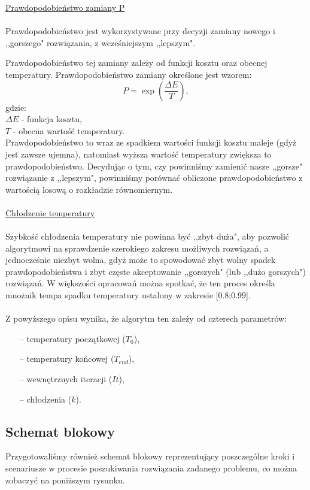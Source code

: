 \documentclass[twoside]{projektInzynierskiMS1}
\newcommand{\newLine}{~\\}
\newcommand{\si}{ś}
\begin{document}
\noindent \underline{Prawdopodobieństwo zamiany P} \\ \newLine
\indent Prawdopodobieństwo jest wykorzystywane przy decyzji zamiany nowego i ,,gorszego" rozwiązania, z wcze\si niejszym ,,lepszym". 

Prawdopodobieństwo tej zamiany zależy od funkcji kosztu oraz obecnej temperatury. Prawdopodobieństwo zamiany okre\si lone jest wzorem:
$$ P = \exp\left(\frac{\Delta E}{T}\right),  $$
gdzie:\\
$ \Delta E$  - funkcja kosztu, \\
$T$ - obecna warto\si ć temperatury.\\

Prawdopodobieństwo to wraz ze spadkiem warto\si ci funkcji kosztu maleje (gdyż jest zawsze ujemna), natomiast wyższa warto\si ć temperatury zwiększa to prawdopodobieństwo. Decydując o tym, czy powinniśmy zamienić nasze ,,gorsze" rozwiązanie z ,,lepszym", powinniśmy porównać obliczone prawdopodobieństwo z wartością losową o rozkładzie równomiernym.\\ \newLine


\noindent \underline{Chłodzenie temperatury} \\ \newLine
\indent Szybkość chłodzenia temperatury nie powinna być ,,zbyt duża", aby pozwolić algorytmowi na sprawdzenie szerokiego zakresu możliwych rozwiązań, a jednocześnie niezbyt wolna, gdyż może to spowodować zbyt wolny spadek prawdopodobieństwa i zbyt częste akceptowanie ,,gorszych" (lub ,,dużo gorszych") rozwiązań. W większości opracowań można spotkać, że ten proces okre\si la mnożnik tempa spadku temperatury ustalony w zakresie [0.8;0.99].\\ \newLine
		

Z powyższego opisu wynika, że algorytm ten zależy od czterech parametrów:
\begin{itemize}
	\item[--] temperatury początkowej ($T_0$),
	\item[--] temperatury końcowej ($T_{end}$),
	\item[--] wewnętrznych iteracji ($It$),
	\item[--] chłodzenia ($k$).
\end{itemize}

\subsection{Schemat blokowy}
Przygotowali\si my również schemat blokowy reprezentujący poszczególne kroki i scenariusze w procesie poszukiwania rozwiązania zadanego problemu, co można zobaczyć na poniższym rysunku.
\end{document}
